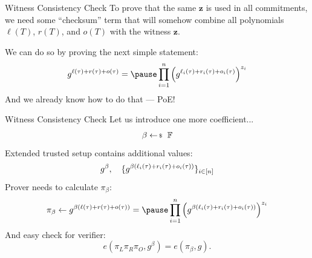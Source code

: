 \documentclass{zkdl-presentation-template}
\begin{document}
    \begin{frame}{Witness Consistency Check}
        To prove that the same $\mathbf{z}$ is used in all commitments, we need some ``checksum''
        term that will somehow combine all polynomials $\ell(T)$, $r(T)$, and $o(T)$ with the witness
        $\mathbf{z}$.
        \pause

        We can do so by proving the next simple statement:
        \vspace{-5pt}
        \begin{equation*}
            g^{\ell(\tau) + r(\tau) + o(\tau)} = \pause \prod_{i=1}^n {\left(g^{\ell_i(\tau) + r_i(\tau) + o_i(\tau)}\right)}^{z_i}
            \vspace{-5pt}
        \end{equation*}
        \pause
        And we already know how to do that --- PoE!
    \end{frame}

    \begin{frame}{Witness Consistency Check}
        Let us introduce one more coefficient...
        \vspace{-5pt}
        \begin{equation*}
            \beta \leftarrowS \mathbb{F}
            \vspace{-5pt}
        \end{equation*}
        \pause
        Extended trusted setup contains additional values:
        \vspace{-5pt}
        \begin{equation*}
            g^{\beta}, \quad \{g^{\beta(\ell_i(\tau) + r_i(\tau) + o_i(\tau))}\}_{i \in [n]}
            \vspace{-5pt}
        \end{equation*}
        \pause
        Prover needs to calculate $\pi_{\beta}$:
        \vspace{-5pt}
        \begin{equation*}
            \pi_{\beta} \gets g^{\beta(\ell(\tau) + r(\tau) + o(\tau))} = \pause \prod_{i=1}^{n} \left(g^{\beta(\ell_i(\tau) + r_i(\tau) + o_i(\tau))}\right)^{z_i}
        \end{equation*}
        \pause
        And easy check for verifier:
        \vspace{-5pt}
        \begin{equation*}
            e(\pi_L\pi_R\pi_O, g^{\beta}) = e(\pi_{\beta}, g).
        \end{equation*}
    \end{frame}
\end{document}
